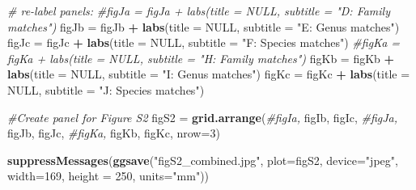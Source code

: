 \documentclass[
]{article}
\newenvironment{Shaded}{\begin{snugshade}}{\end{snugshade}}
\newcommand{\CommentTok}[1]{\textcolor[rgb]{0.56,0.35,0.01}{\textit{#1}}}
\newcommand{\DataTypeTok}[1]{\textcolor[rgb]{0.13,0.29,0.53}{#1}}
\newcommand{\DecValTok}[1]{\textcolor[rgb]{0.00,0.00,0.81}{#1}}
\newcommand{\KeywordTok}[1]{\textcolor[rgb]{0.13,0.29,0.53}{\textbf{#1}}}
\newcommand{\NormalTok}[1]{#1}
\newcommand{\OperatorTok}[1]{\textcolor[rgb]{0.81,0.36,0.00}{\textbf{#1}}}
\newcommand{\OtherTok}[1]{\textcolor[rgb]{0.56,0.35,0.01}{#1}}
\newcommand{\StringTok}[1]{\textcolor[rgb]{0.31,0.60,0.02}{#1}}
\begin{document}
\begin{Shaded}
\begin{Highlighting}[]
\CommentTok{# re-label panels: }
\CommentTok{#figJa = figJa + labs(title = NULL, subtitle = "D: Family matches")}
\NormalTok{figJb =}\StringTok{ }\NormalTok{figJb }\OperatorTok{+}\StringTok{ }\KeywordTok{labs}\NormalTok{(}\DataTypeTok{title =} \OtherTok{NULL}\NormalTok{, }\DataTypeTok{subtitle =} \StringTok{"E: Genus matches"}\NormalTok{)}
\NormalTok{figJc =}\StringTok{ }\NormalTok{figJc }\OperatorTok{+}\StringTok{ }\KeywordTok{labs}\NormalTok{(}\DataTypeTok{title =} \OtherTok{NULL}\NormalTok{, }\DataTypeTok{subtitle =} \StringTok{"F: Species matches"}\NormalTok{)}
\CommentTok{#figKa = figKa + labs(title = NULL, subtitle = "H: Family matches")}
\NormalTok{figKb =}\StringTok{ }\NormalTok{figKb }\OperatorTok{+}\StringTok{ }\KeywordTok{labs}\NormalTok{(}\DataTypeTok{title =} \OtherTok{NULL}\NormalTok{, }\DataTypeTok{subtitle =} \StringTok{"I: Genus matches"}\NormalTok{)}
\NormalTok{figKc =}\StringTok{ }\NormalTok{figKc }\OperatorTok{+}\StringTok{ }\KeywordTok{labs}\NormalTok{(}\DataTypeTok{title =} \OtherTok{NULL}\NormalTok{, }\DataTypeTok{subtitle =} \StringTok{"J: Species matches"}\NormalTok{)}

\CommentTok{#Create panel for Figure S2}
\NormalTok{figS2 =}\StringTok{ }\KeywordTok{grid.arrange}\NormalTok{(}\CommentTok{#figIa, }
\NormalTok{  figIb, figIc, }\CommentTok{#figJa, }
\NormalTok{  figJb, figJc, }\CommentTok{#figKa, }
\NormalTok{  figKb, figKc, }\DataTypeTok{nrow=}\DecValTok{3}\NormalTok{)}
\end{Highlighting}
\end{Shaded}

\begin{Shaded}
\begin{Highlighting}[]
\KeywordTok{suppressMessages}\NormalTok{(}\KeywordTok{ggsave}\NormalTok{(}\StringTok{"figS2_combined.jpg"}\NormalTok{, }\DataTypeTok{plot=}\NormalTok{figS2, }\DataTypeTok{device=}\StringTok{"jpeg"}\NormalTok{, }\DataTypeTok{width=}\DecValTok{169}\NormalTok{, }\DataTypeTok{height =} \DecValTok{250}\NormalTok{, }\DataTypeTok{units=}\StringTok{"mm"}\NormalTok{))}
\end{Highlighting}
\end{Shaded}
\end{document}
